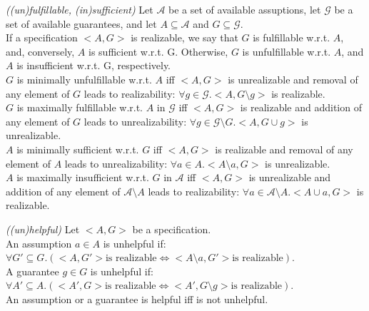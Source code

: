 
\begin{definition}\label{def:fulfillable}\emph{((un)fulfillable, (in)sufficient)}
Let $\mathcal{A}$ be a set of available assuptions, let $\mathcal{G}$ be a set of available
guarantees, and let $A \subseteq \mathcal{A}$ and $G \subseteq \mathcal{G}$.\\
If a specification $<A,G>$ is realizable, we say that $G$ is fulfillable w.r.t. $A$,
and, conversely, $A$ is sufficient w.r.t. G. Otherwise, $G$ is unfulfillable w.r.t. 
$A$, and $A$ is insufficient w.r.t. G, respectively.\\
$G$ is minimally unfulfillable w.r.t.
$A$ iff $<A,G>$ is unrealizable and removal of any element of $G$ leads to realizability:
$\forall g \in \mathcal{G}. <A, G \setminus {g}>$ is realizable.\\
$G$ is maximally fulfillable w.r.t. $A$ in $\mathcal{G}$ iff $<A,G>$ is realizable and addition
of any element of $G$ leads to unrealizability: 
$\forall g \in \mathcal{G} \setminus G. <A, G \cup {g}>$ is unrealizable.\\
$A$ is minimally sufficient w.r.t. $G$ iff $<A,G>$ is realizable and removal of any element
of $A$ leads to unrealizability: $\forall a \in A. <A\setminus {a},G>$ is unrealizable.\\
$A$ is maximally insufficient w.r.t. $G$ in $\mathcal{A}$ iff $<A,G>$ is unrealizable and addition
of any element of $\mathcal{A}\setminus A$ leads to realizability: 
$\forall a \in \mathcal{A}\setminus A.<A \cup {a},G>$ is realizable.
\end{definition}
\begin{definition}\label{def:helpful}\emph{((un)helpful)}
Let $<A,G>$ be a specification. \\
An assumption $a \in A$ is unhelpful if:\\
$\forall G' \subseteq G. (<A,G'> \text{is realizable} \iff <A\setminus {a},G'> \text{is realizable})$.\\
A guarantee $g \in G$ is unhelpful if:\\ $\forall A' \subseteq A. (<A',G> \text{is realizable} \iff <A', G \setminus {g}> \text{is realizable})$.\\
An assumption or a guarantee is helpful iff is not unhelpful.
\end{definition}
